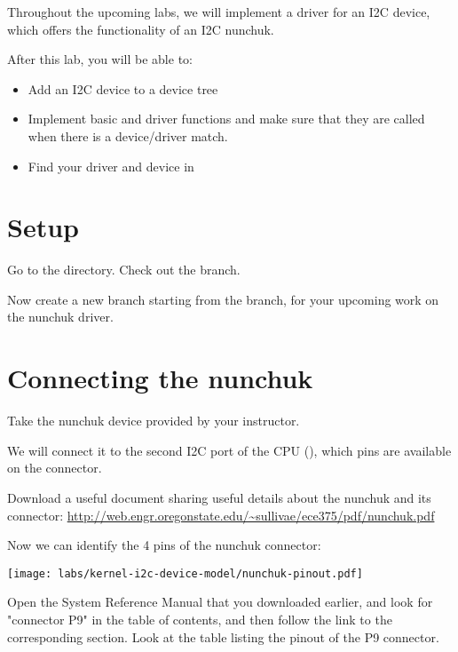 
Throughout the upcoming labs, we will implement a driver for an I2C
device, which offers the functionality of an I2C nunchuk.

After this lab, you will be able to:

\begin{itemize}
\item Add an I2C device to a device tree
\item Implement basic  and  driver
functions and make sure that they are called when there is a
device/driver match.
\item Find your driver and device in 
\end{itemize}

\section{Setup}

Go to the  directory. Check out the
 branch. 

Now create a new  branch starting from the
 branch,  for your upcoming work on the nunchuk
driver.  

\section{Connecting the nunchuk}

Take the nunchuk device provided by your instructor.

We will connect it to the second I2C port of the CPU (),
which pins are available on the  connector.

Download a useful document sharing useful details about the nunchuk
and its connector: 
\url{http://web.engr.oregonstate.edu/~sullivae/ece375/pdf/nunchuk.pdf}

Now we can identify the 4 pins of the nunchuk connector:

\begin{center}
\texttt{[image: labs/kernel-i2c-device-model/nunchuk-pinout.pdf]}
\end{center}

Open the System Reference Manual that you downloaded earlier,
and look for "connector P9" in the table of contents, and then
follow the link to the corresponding section. Look at the table listing
the pinout of the P9 connector.

